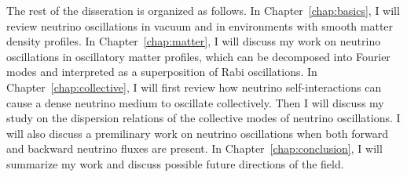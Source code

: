 The rest of the disseration is organized as follows.
In Chapter~\ref{chap:basics}, I will review neutrino oscillations in vacuum and in environments with smooth matter density profiles.
In Chapter~\ref{chap:matter}, I will discuss my work on neutrino oscillations in oscillatory matter profiles, which can be decomposed into Fourier modes and interpreted as a superposition of Rabi oscillations.
In Chapter~\ref{chap:collective}, I will first review how neutrino self-interactions can cause a dense neutrino medium to oscillate collectively. Then I will discuss my study on the dispersion relations of the collective modes of neutrino oscillations.
I will also discuss a premilinary work on neutrino oscillations when both forward and backward neutrino fluxes are present.
In Chapter~\ref{chap:conclusion}, I will summarize my work and discuss possible future directions of the field.
